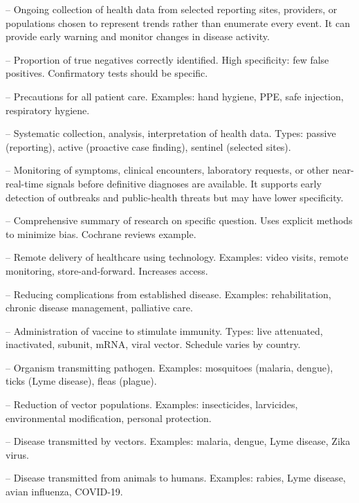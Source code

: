 -- Ongoing collection of health data from selected reporting sites, providers, or populations chosen to represent trends rather than enumerate every event. It can provide early warning and monitor changes in disease activity.

-- Proportion of true negatives correctly identified. High specificity: few false positives. Confirmatory tests should be specific.

-- Precautions for all patient care. Examples: hand hygiene, PPE, safe injection, respiratory hygiene.

-- Systematic collection, analysis, interpretation of health data. Types: passive (reporting), active (proactive case finding), sentinel (selected sites).

-- Monitoring of symptoms, clinical encounters, laboratory requests, or other near-real-time signals before definitive diagnoses are available. It supports early detection of outbreaks and public-health threats but may have lower specificity.

-- Comprehensive summary of research on specific question. Uses explicit methods to minimize bias. Cochrane reviews example.

-- Remote delivery of healthcare using technology. Examples: video visits, remote monitoring, store-and-forward. Increases access.

-- Reducing complications from established disease. Examples: rehabilitation, chronic disease management, palliative care.

-- Administration of vaccine to stimulate immunity. Types: live attenuated, inactivated, subunit, mRNA, viral vector. Schedule varies by country.

-- Organism transmitting pathogen. Examples: mosquitoes (malaria, dengue), ticks (Lyme disease), fleas (plague).

-- Reduction of vector populations. Examples: insecticides, larvicides, environmental modification, personal protection.

-- Disease transmitted by vectors. Examples: malaria, dengue, Lyme disease, Zika virus.

-- Disease transmitted from animals to humans. Examples: rabies, Lyme disease, avian influenza, COVID-19.
